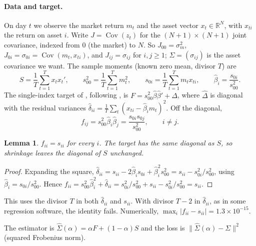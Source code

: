 \documentclass[11pt]{article}
\newtheorem{lemma}{Lemma}
\theoremstyle{remark}
\begin{document}
\paragraph{Data and target.}
On day $t$ we observe the market return $m_t$ and the asset vector $x_t \in \mathbb{R}^N$, with $x_{ti}$ the return on asset $i$. Write $J = \operatorname{Cov}(z_t)$ for the $(N+1)\times(N+1)$ joint covariance, indexed from $0$ (the market) to $N$. So $J_{00} = \sigma_m^2$, $J_{0i} = \sigma_{0i} = \operatorname{Cov}(m_t, x_{ti})$, and $J_{ij} = \sigma_{ij}$ for $i,j \ge 1$; $\Sigma = (\sigma_{ij})$ is the asset covariance we want. The sample moments (known zero mean, divisor $T$) are
\[
  S = \frac{1}{T}\sum_{t=1}^T x_t x_t', \qquad
  s_{00}^2 = \frac{1}{T}\sum_{t=1}^T m_t^2, \qquad
  s_{0i} = \frac{1}{T}\sum_{t=1}^T m_t x_{ti}, \qquad
  \hat\beta_i = \frac{s_{0i}}{s_{00}^2}.
\]
The single-index target of \citet{ledoit2003}, following \citet{sharpe1963}, is $F = s_{00}^2\hat\beta\hat\beta' + \hat\Delta$, where $\hat\Delta$ is diagonal with the residual variances $\hat\delta_{ii} = \frac{1}{T}\sum_t (x_{ti} - \hat\beta_i m_t)^2$. Off the diagonal,
\[
  f_{ij} = s_{00}^2\hat\beta_i\hat\beta_j = \frac{s_{0i}s_{0j}}{s_{00}^2}, \qquad i \ne j.
\]

\begin{lemma}\label{lem:diag}
$f_{ii} = s_{ii}$ for every $i$. The target has the same diagonal as $S$, so shrinkage leaves the diagonal of $S$ unchanged.
\end{lemma}

\begin{proof}
Expanding the square, $\hat\delta_{ii} = s_{ii} - 2\hat\beta_i s_{0i} + \hat\beta_i^2 s_{00}^2 = s_{ii} - s_{0i}^2/s_{00}^2$, using $\hat\beta_i = s_{0i}/s_{00}^2$. Hence $f_{ii} = s_{00}^2\hat\beta_i^2 + \hat\delta_{ii} = s_{0i}^2/s_{00}^2 + s_{ii} - s_{0i}^2/s_{00}^2 = s_{ii}$.
\end{proof}

This uses the divisor $T$ in both $\hat\delta_{ii}$ and $s_{ii}$. With divisor $T-2$ in $\hat\delta_{ii}$, as in some regression software, the identity fails. Numerically, $\max_i|f_{ii} - s_{ii}| = 1.3\times10^{-15}$.

The estimator is $\hat\Sigma(\alpha) = \alpha F + (1-\alpha)S$ and the loss is $\|\hat\Sigma(\alpha) - \Sigma\|^2$ (squared Frobenius norm).
\end{document}
